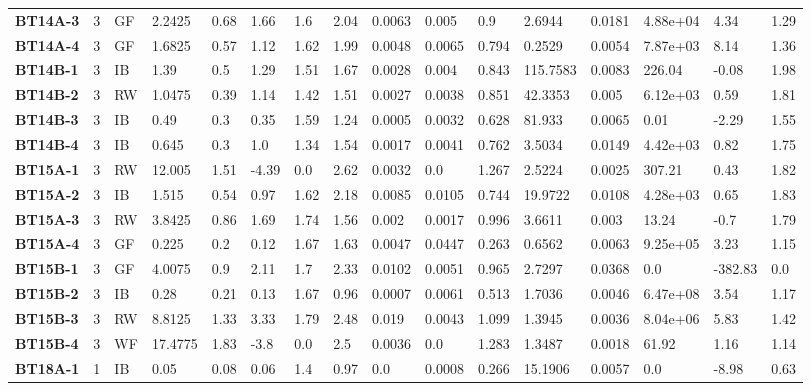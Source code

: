 \begin{table}
{\begin{tabular}{l|c|l|l|l|l|l|l|l|l|l|l|l|l|l|l}
    \bfseries BT14A-3 & 3 & GF & 2.2425 & 0.68 & 1.66 & 1.6 & 2.04 & 0.0063 & 0.005 & 0.9 & 2.6944 & 0.0181 & 4.88e+04 & 4.34 & 1.29 \\
    \bfseries BT14A-4 & 3 & GF & 1.6825 & 0.57 & 1.12 & 1.62 & 1.99 & 0.0048 & 0.0065 & 0.794 & 0.2529 & 0.0054 & 7.87e+03 & 8.14 & 1.36 \\
    \hline
    \bfseries BT14B-1 & 3 & IB & 1.39 & 0.5 & 1.29 & 1.51 & 1.67 & 0.0028 & 0.004 & 0.843 & 115.7583 & 0.0083 & 226.04 & -0.08 & 1.98 \\
    \bfseries BT14B-2 & 3 & RW & 1.0475 & 0.39 & 1.14 & 1.42 & 1.51 & 0.0027 & 0.0038 & 0.851 & 42.3353 & 0.005 & 6.12e+03 & 0.59 & 1.81 \\
    \bfseries BT14B-3 & 3 & IB & 0.49 & 0.3 & 0.35 & 1.59 & 1.24 & 0.0005 & 0.0032 & 0.628 & 81.933 & 0.0065 & 0.01 & -2.29 & 1.55 \\
    \bfseries BT14B-4 & 3 & IB & 0.645 & 0.3 & 1.0 & 1.34 & 1.54 & 0.0017 & 0.0041 & 0.762 & 3.5034 & 0.0149 & 4.42e+03 & 0.82 & 1.75 \\
    \hline
    \bfseries BT15A-1 & 3 & RW & 12.005 & 1.51 & -4.39 & 0.0 & 2.62 & 0.0032 & 0.0 & 1.267 & 2.5224 & 0.0025 & 307.21 & 0.43 & 1.82 \\
    \bfseries BT15A-2 & 3 & IB & 1.515 & 0.54 & 0.97 & 1.62 & 2.18 & 0.0085 & 0.0105 & 0.744 & 19.9722 & 0.0108 & 4.28e+03 & 0.65 & 1.83 \\
    \bfseries BT15A-3 & 3 & RW & 3.8425 & 0.86 & 1.69 & 1.74 & 1.56 & 0.002 & 0.0017 & 0.996 & 3.6611 & 0.003 & 13.24 & -0.7 & 1.79 \\
    \bfseries BT15A-4 & 3 & GF & 0.225 & 0.2 & 0.12 & 1.67 & 1.63 & 0.0047 & 0.0447 & 0.263 & 0.6562 & 0.0063 & 9.25e+05 & 3.23 & 1.15 \\
    \hline
    \bfseries BT15B-1 & 3 & GF & 4.0075 & 0.9 & 2.11 & 1.7 & 2.33 & 0.0102 & 0.0051 & 0.965 & 2.7297 & 0.0368 & 0.0 & -382.83 & 0.0 \\
    \bfseries BT15B-2 & 3 & IB & 0.28 & 0.21 & 0.13 & 1.67 & 0.96 & 0.0007 & 0.0061 & 0.513 & 1.7036 & 0.0046 & 6.47e+08 & 3.54 & 1.17 \\
    \bfseries BT15B-3 & 3 & RW & 8.8125 & 1.33 & 3.33 & 1.79 & 2.48 & 0.019 & 0.0043 & 1.099 & 1.3945 & 0.0036 & 8.04e+06 & 5.83 & 1.42 \\
    \bfseries BT15B-4 & 3 & WF & 17.4775 & 1.83 & -3.8 & 0.0 & 2.5 & 0.0036 & 0.0 & 1.283 & 1.3487 & 0.0018 & 61.92 & 1.16 & 1.14 \\
    \hline
    \bfseries BT18A-1 & 1 & IB & 0.05 & 0.08 & 0.06 & 1.4 & 0.97 & 0.0 & 0.0008 & 0.266 & 15.1906 & 0.0057 & 0.0 & -8.98 & 0.63 \\

\end{tabular}}
\end{table}
